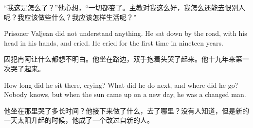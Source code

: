\documentclass[fontset=ubuntu, zihao=5]{ctexart}
\begin{document}
\begin{paracol}{2}
  \switchcolumn
  “我这是怎么了？”他心想，“一切都变了。主教对我这么好，我怎么还能去恨别人呢？我应该做些什么？我应该怎样生活呢？”

  \switchcolumn*

  Prisoner Valjean did not understand anything. He sat down by the road, with his head in his hands, and cried. He cried for the first time in nineteen years.

  \switchcolumn

  囚犯冉阿让什么都想不明白。他坐在路边，双手抱着头哭了起来。他十九年来第一次哭了起来。

  \switchcolumn*

  How long did he sit there, crying? What did he do next, and where did he go? Nobody knows, but when the sun came up on a new day, he was a changed man.

  \switchcolumn

  他坐在那里哭了多长时间？他接下来做了什么，去了哪里？没有人知道，但是新的一天太阳升起的时候，他成了一个改过自新的人。



\end{paracol}
\end{document}

